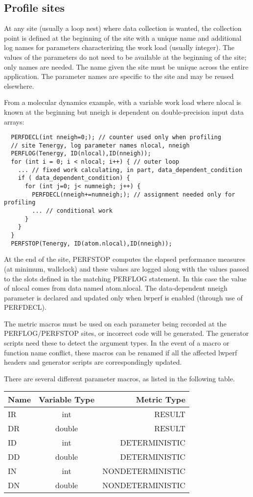 \documentclass{article}
\begin{document}
\subsection{Profile sites}
At any site (usually a loop nest) where data collection is wanted, the collection point is defined at the beginning of the site with a unique name and additional log names for parameters characterizing the work load (usually integer). The values of the parameters do not need to be available at the beginning of the site; only names are needed. The name given the site must be unique across the entire application. The parameter names are specific to the site and may be reused elsewhere.

From a molecular dynamics example, with a variable work load where nlocal is known at the beginning but nneigh is dependent on double-precision input data arrays:
\begin{verbatim}
  PERFDECL(int nneigh=0;); // counter used only when profiling
  // site Tenergy, log parameter names nlocal, nneigh
  PERFLOG(Tenergy, ID(nlocal),ID(nneigh)); 
  for (int i = 0; i < nlocal; i++) { // outer loop
    ... // fixed work calculating, in part, data_dependent_condition
    if ( data_dependent_condition) {
      for (int j=0; j< numneigh; j++) {
        PERFDECL(nneigh+=numneigh;); // assignment needed only for profiling
        ... // conditional work
      }
    }
  }
  PERFSTOP(Tenergy, ID(atom.nlocal),ID(nneigh));
\end{verbatim}

At the end of the site, PERFSTOP computes the elapsed performance measures (at minimum, wallclock) and these values are logged along with the values passed to the slots defined in the matching PERFLOG statement. In this case the value of nlocal comes from data named atom.nlocal. The data-dependent nneigh parameter is declared and updated only when lwperf is enabled (through use of PERFDECL).

The metric macros must be used on each parameter being recorded at the PERFLOG/PERFSTOP sites, or incorrect code will be generated. The generator scripts need these to detect the argument types. In the event of a macro or function name conflict, these macros can be renamed if all the affected lwperf headers and generator scripts are correspondingly updated.

There are several different parameter macros, as listed in the following table.

\begin{tabular}{ l | c | r }
    Name & Variable Type & Metric Type \\
    \hline 
    IR & int & RESULT \\
    DR & double & RESULT \\
    ID & int & DETERMINISTIC \\
    DD & double & DETERMINISTIC \\
    IN & int & NONDETERMINISTIC \\
    DN & double & NONDETERMINISTIC \\
\end{tabular}
\end{document}
